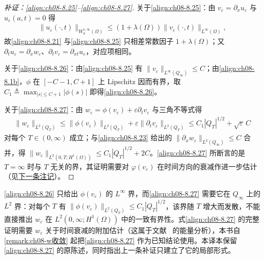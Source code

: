 \documentclass[../../main.tex]{subfiles}%
\begin{document}
\begin{proof}[补证：\eqref{align:ch08-8.25}--\eqref{align:ch08-8.27}]
关于\eqref{align:ch08-8.25}：由 $v_\varepsilon=\partial_xu_\varepsilon$ 与 $u_\varepsilon(a,t)=0$ 得
\begin{align*}
\|u_\varepsilon(\cdot,t)\|_{W^{1,\infty}_0(\Omega)}
\leqslant(1+\lambda(\Omega))\|v_\varepsilon(\cdot,t)\|_{L^\infty(\Omega)},
\end{align*}
故\eqref{align:ch08-8.21} 与\eqref{align:ch08-8.25} 只相差常数因子 $1+\lambda(\Omega)$；又 $\partial_tu_\varepsilon=\partial_xw_\varepsilon$、$\partial_tv_\varepsilon=\partial_{xt}u_\varepsilon$，对应项相同。

关于\eqref{align:ch08-8.26}：由\eqref{align:ch08-8.25} 有 $\|v_\varepsilon\|_{L^\infty(Q_\infty)}\leqslant C$；由\eqref{align:ch08-8.1b}，$\phi$ 在 $[-C-1,C+1]$ 上 Lipschitz 因而有界，取 $C_1\triangleq\max_{|s|\leqslant C+1}|\phi(s)|$ 即得\eqref{align:ch08-8.26}。

关于\eqref{align:ch08-8.27}：由 $w_\varepsilon=\phi(v_\varepsilon)+\varepsilon\partial_tv_\varepsilon$ 与三角不等式得
\begin{align*}
\|w_\varepsilon\|_{L^2(Q_T)}\leqslant\|\phi(v_\varepsilon)\|_{L^2(Q_T)}+\varepsilon\|\partial_tv_\varepsilon\|_{L^2(Q_T)}
\leqslant C_1|Q_T|^{1/2}+\sqrt{\varepsilon}\,C
\end{align*}
对每个 $T\in(0,\infty)$ 成立；与\eqref{align:ch08-8.23} 给出的 $\|\partial_xw_\varepsilon\|_{L^2(Q_\infty)}\leqslant C$ 合并，得 $\|w_\varepsilon\|_{L^2(0,T;H^1(\Omega))}\leqslant C_1|Q_T|^{1/2}+2C$。\eqref{align:ch08-8.27} 所断言的是 $T=\infty$ 时与 $T$ 无关的界，其证明需要对 $\varphi(v_\varepsilon)$ 在时间方向的衰减作进一步估计（见\hyperref[remark:ch08-8.27说明]{下一条注记}）。
\end{proof}

\begin{remark}\label{remark:ch08-8.27说明}
\eqref{align:ch08-8.26} 只给出 $\phi(v_\varepsilon)$ 的 $L^\infty$ 界，而\eqref{align:ch08-8.27} 需要它在 $Q_\infty$ 上的 $L^2$ 界：对每个 $T$ 有 $\|\phi(v_\varepsilon)\|_{L^2(Q_T)}\leqslant C_1|Q_T|^{1/2}$，该界随 $T$ 增大而发散，不能直接推出 $w_\varepsilon$ 在 $L^2(0,\infty;H^1(\Omega))$ 中的一致有界性。式\eqref{align:ch08-8.27} 的完整证明需要 $w_\varepsilon$ 关于时间衰减的附加估计（这属于文献~\cite{ref74} 的能量分析），本书自\cref{remark:ch08-w收敛} 起把\eqref{align:ch08-8.27} 作为已知结论使用。本译本保留\eqref{align:ch08-8.27} 的原陈述，同时指出上一条补证只建立了它的局部形式。
\end{remark}
\end{document}
